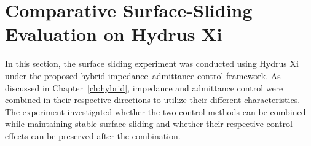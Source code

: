 








\section{Comparative Surface-Sliding Evaluation on Hydrus Xi}

In this section, the surface sliding experiment was conducted using Hydrus Xi under the proposed hybrid impedance--admittance control framework. As discussed in Chapter~\ref{ch:hybrid}, impedance and admittance control were combined in their respective directions to utilize their different characteristics. The experiment investigated whether the two control methods can be combined while maintaining stable surface sliding and whether their respective control effects can be preserved after the combination.

